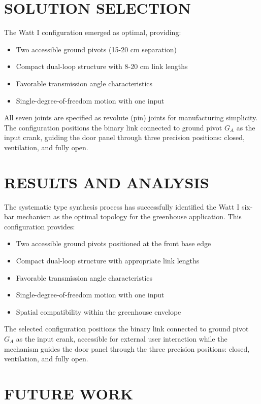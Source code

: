 \documentclass[12pt]{article}
\begin{document}
\section*{SOLUTION SELECTION}

The Watt I configuration emerged as optimal, providing:
\begin{itemize}
    \item Two accessible ground pivots (15-20 cm separation)
    \item Compact dual-loop structure with 8-20 cm link lengths
    \item Favorable transmission angle characteristics
    \item Single-degree-of-freedom motion with one input
\end{itemize}

All seven joints are specified as revolute (pin) joints for manufacturing simplicity. The configuration positions the binary link connected to ground pivot $G_A$ as the input crank, guiding the door panel through three precision positions: closed, ventilation, and fully open.

\section*{RESULTS AND ANALYSIS}

The systematic type synthesis process has successfully identified the Watt I six-bar mechanism as the optimal topology for the greenhouse application. This configuration provides:

\begin{itemize}
    \item Two accessible ground pivots positioned at the front base edge
    \item Compact dual-loop structure with appropriate link lengths
    \item Favorable transmission angle characteristics
    \item Single-degree-of-freedom motion with one input
    \item Spatial compatibility within the greenhouse envelope
\end{itemize}

The selected configuration positions the binary link connected to ground pivot $G_A$ as the input crank, accessible for external user interaction while the mechanism guides the door panel through the three precision positions: closed, ventilation, and fully open.

\section*{FUTURE WORK}
\end{document}
